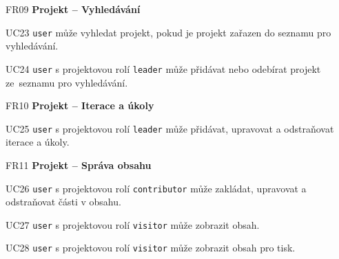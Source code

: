 \begin{dlnar}
   \item[FR09] \textbf{Projekt -- Vyhledávání}
   
   \begin{dlnar}
      \item[UC23] 
      \texttt{user} může vyhledat projekt, pokud je projekt zařazen do seznamu pro vyhledávání.

      \item[UC24]
      \texttt{user} s projektovou rolí \texttt{leader} může přidávat nebo odebírat projekt ze~seznamu pro vyhledávání.
   \end{dlnar}
\end{dlnar}


\begin{dlnar}
   \item[FR10] \textbf{Projekt -- Iterace a úkoly}
   
   \begin{dlnar}
      \item[UC25] 
      \texttt{user} s projektovou rolí \texttt{leader} může přidávat, upravovat a odstraňovat iterace a úkoly.
   \end{dlnar}
\end{dlnar}


\begin{dlnar}
   \item[FR11] \textbf{Projekt -- Správa obsahu}
 
   \begin{dlnar}
      \item[UC26] 
      \texttt{user} s projektovou rolí \texttt{contributor} může zakládat, upravovat a odstraňovat části v obsahu. 

      \item[UC27] 
      \texttt{user} s projektovou rolí \texttt{visitor} může zobrazit obsah.

      \item[UC28] 
      \texttt{user} s projektovou rolí \texttt{visitor} může zobrazit obsah pro tisk.
   \end{dlnar}
\end{dlnar}


